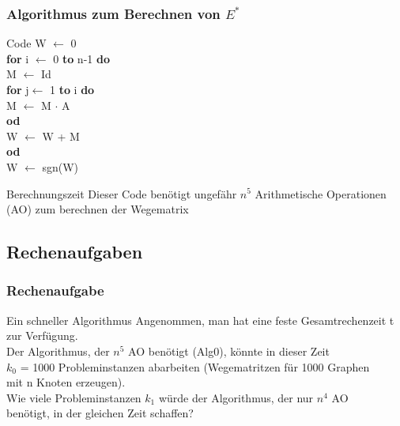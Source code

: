 \documentclass{beamer}
\begin{document}
\begin{frame}
	\frametitle{Algorithmus zum Berechnen von $E^*$}
	\begin{block}{Code}
		W $\leftarrow$ 0\\
		\textbf{for} i $\leftarrow$ 0 \textbf{to} n-1 \textbf{do}\\
		\hspace{0.5 cm}M $\leftarrow$ Id\\
		\hspace{0.5 cm}\textbf{for} j$\leftarrow$ 1 \textbf{to} i \textbf{do}\\
		\hspace{1 cm}M $\leftarrow$ M $\cdot$ A\\
		\hspace{0.5 cm}\textbf{od}\\
		\hspace{0.5 cm}W $\leftarrow$ W + M\\
		\textbf{od} \\
		W $\leftarrow$ sgn(W)
	\end{block}
	\begin{block}{Berechnungszeit}
	Dieser Code benötigt ungef\"ahr $n^5$ Arithmetische Operationen (AO) zum berechnen der Wegematrix
	\end{block}
\end{frame}

\subsection{Rechenaufgaben}

\begin{frame}
	\frametitle{Rechenaufgabe}
	\begin{block}{Ein schneller Algorithmus}
		Angenommen, man hat eine feste Gesamtrechenzeit t zur Verf\"ugung.\\
		Der Algorithmus, der $n^5$ AO ben\"otigt (Alg0), k\"onnte in dieser Zeit \\
		$k_0$ = 1000 Probleminstanzen abarbeiten (Wegematritzen f\"ur 1000 Graphen \\
		mit n Knoten erzeugen).\\
		\hspace{0.5 cm} Wie viele Probleminstanzen $k_1$ w\"urde der Algorithmus, der nur $n^4$ AO \\
		ben\"otigt, in der gleichen Zeit schaffen?
	\end{block}
\end{frame}
\end{document}
